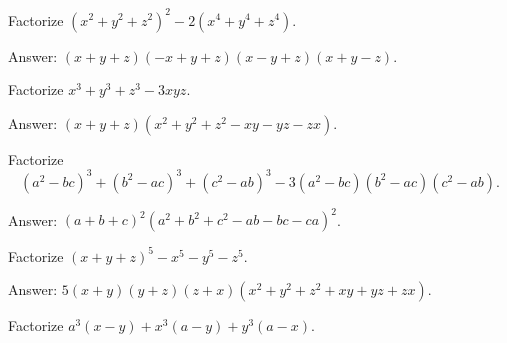\begin{tcolorbox}
\begin{question}
Factorize $(x^2+y^2+z^2)^2 - 2(x^4+y^4+z^4)$.
\end{question}
\end{tcolorbox}

\begin{solution}[name=Solution by Parviz Shahriari]
Answer: $(x+y+z)(-x+y+z)(x-y+z)(x+y-z)$.
\end{solution}



\begin{tcolorbox}
\begin{question}
Factorize $x^3+y^3+z^3-3xyz$.
\end{question}
\end{tcolorbox}

\begin{solution}[name=Solution by Parviz Shahriari]
Answer: $(x+y+z)(x^2+y^2+z^2-xy-yz-zx)$.
\end{solution}


\begin{tcolorbox}
\begin{question}
Factorize \[(a^2-bc)^3+(b^2-ac)^3+(c^2-ab)^3-3(a^2-bc)(b^2-ac)(c^2-ab).\]
\end{question}
\end{tcolorbox}

\begin{solution}[name=Solution by Parviz Shahriari]
Answer: $(a+b+c)^2(a^2+b^2+c^2-ab-bc-ca)^2$.
\end{solution}



\begin{tcolorbox}
\begin{question}
Factorize $(x+y+z)^5-x^5-y^5-z^5$.
\end{question}
\end{tcolorbox}

\begin{solution}[name=Solution by Parviz Shahriari]
Answer: $5(x+y)(y+z)(z+x)(x^2+y^2+z^2+xy+yz+zx)$.
\end{solution}




\begin{tcolorbox}
\begin{question}
Factorize $a^3(x-y) + x^3(a-y) + y^3(a-x)$.
\end{question}
\end{tcolorbox}

